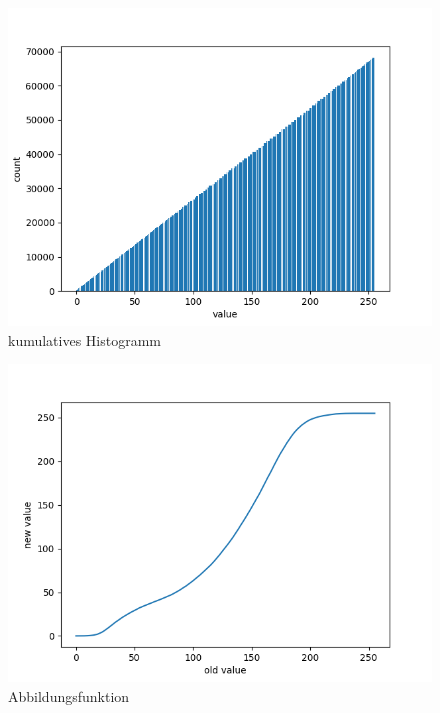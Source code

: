 \documentclass[12pt]{article}
\begin{document}
\begin{figure}[h]
\begin{minipage}{0.32\textwidth}
    \includegraphics[width=\textwidth]{ergebnisbild_histogramm_kumulativ.png}
    kumulatives Histogramm
  \end{minipage}
\end{figure}
\begin{figure}[h]
  \centering
  \begin{minipage}{0.5\textwidth}
    \centering
    \includegraphics[width=\textwidth]{abbildungsfunktion.png}
    Abbildungsfunktion
  \end{minipage}
\end{figure}
\vfill
\end{document}
